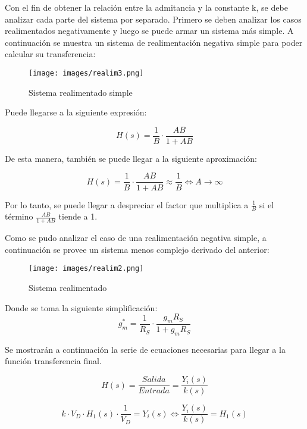 \documentclass[12pt,oneside,a4paper]{article}
\begin{document}
Con el fin de obtener la relación entre la admitancia y la constante k, se debe analizar cada 
parte del sistema por separado. Primero se deben analizar los casos realimentados negativamente 
y luego se puede armar un sistema más simple. A continuación se muestra un sistema de realimentación 
negativa simple para poder calcular su transferencia:

\begin{figure}[H]
    \centering
    \texttt{[image: images/realim3.png]}
    \caption{Sistema realimentado simple}
\end{figure}

Puede llegarse a la siguiente expresión:

\begin{equation}
    H(s) = \frac{1}{B} \cdot \frac{AB}{1 + AB}
\end{equation}

De esta manera, también se puede llegar a la siguiente aproximación:

\begin{equation}
    H(s) = \frac{1}{B} \cdot \frac{AB}{1 + AB} \approx \frac{1}{B} \iff A \rightarrow \infty
\end{equation}

Por lo tanto, se puede llegar a despreciar el factor que multiplica a $\frac{1}{B}$ si el término 
$\frac{AB}{1 + AB}$ tiende a 1.

Como se pudo analizar el caso de una realimentación negativa simple, a continuación se provee 
un sistema menos complejo derivado del anterior:

\begin{figure}[H]
    \centering
    \texttt{[image: images/realim2.png]}
    \caption{Sistema realimentado}
\end{figure}

Donde se toma la siguiente simplificación:
\begin{equation}
    g_m^* = \frac{1}{R_S} \cdot \frac{g_m R_S}{1 + g_m R_S}
\end{equation}

Se mostrarán a continuación la serie de ecuaciones necesarias para llegar a la función transferencia
final.

\begin{equation}
    H(s) = \frac{Salida}{Entrada} = \frac{Y_i(s)}{k(s)}
\end{equation}

\begin{equation}
    k\cdot V_D \cdot H_1(s) \cdot \frac{1}{V_D} = Y_i(s) \iff \frac{Y_i(s)}{k(s)} = H_1(s)
\end{equation}
\end{document}
